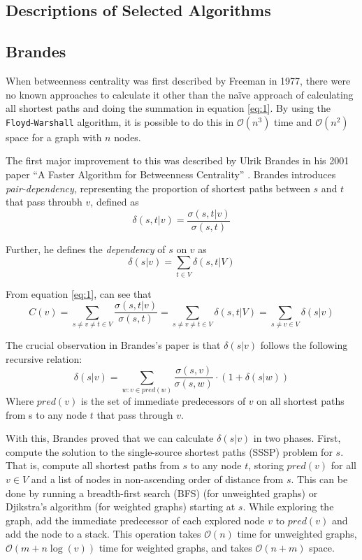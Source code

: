 \documentclass[a4paper,12pt]{article}
\begin{document}
\subsection{Descriptions of Selected Algorithms}\label{sec:algorithms}

\subsection{Brandes}

When betweenness centrality was first described by Freeman in 1977, there were no known approaches to calculate it other than the na\"ive approach of calculating all shortest paths and doing the summation in equation \ref{eq:1}. By using the \texttt{Floyd}-\texttt{Warshall} algorithm, it is possible to do this in $\mathcal{O}(n^3)$ time and $\mathcal{O}(n^2)$ space for a graph with $n$ nodes. 

The first major improvement to this was described by Ulrik Brandes in his 2001 paper ``A Faster Algorithm for Betweenness Centrality'' \cite{brandes}. Brandes introduces \textit{pair-dependency}, representing the proportion of shortest paths between $s$ and $t$ that pass throubh $v$, defined as \begin{equation} \label{eq:pairdelta}
\delta(s,t|v) = \frac{\sigma(s,t|v)}{\sigma(s,t)}
\end{equation}

Further, he defines the \textit{dependency} of $s$ on $v$ as \begin{equation}\label{eq:delta}
\delta(s|v) = \sum_{t \in V} \delta(s,t|V)
\end{equation}

From equation \ref{eq:1}, can see that\begin{equation}\label{eq:deltacentrality}
C(v) = \sum_{s\neq v \neq t \in V} \frac{\sigma(s,t|v)}{\sigma(s,t)} =  \sum_{s\neq v \neq t \in V} \delta(s,t|V) = \sum_{s\neq v \in V} \delta(s|v)
\end{equation}

The crucial observation in Brandes's paper is that $\delta(s|v)$ follows the following recursive relation: \begin{equation}\label{eq:brandesdelta}
\delta(s|v) = \sum_{w: v \in pred(w)} \frac{\sigma(s,v)}{\sigma(s,w)} \cdot (1+\delta(s|w))
\end{equation} 
Where $pred(v)$ is the set of immediate predecessors of $v$ on all shortest paths from s to any node $t$ that pass through $v$.

With this, Brandes proved that we can calculate $\delta(s|v)$ in two phases. First, compute the solution to the single-source shortest paths (SSSP) problem for $s$. That is, compute all shortest paths from $s$ to any node $t$, storing $pred(v)$ for all $v \in V$ and a list of nodes in non-ascending order of distance from $s$. This can be done by running a breadth-first search (BFS) (for unweighted graphs) or Djikstra's algorithm (for weighted graphs) starting at $s$. While exploring the graph, add the immediate predecessor of each explored node $v$ to $pred(v)$ and add the node to a stack. This operation takes $\mathcal{O}(n)$ time for unweighted graphs, $\mathcal{O}(m+n\log(v))$ time for weighted graphs, and takes $\mathcal{O}(n+m)$ space.
\end{document}
